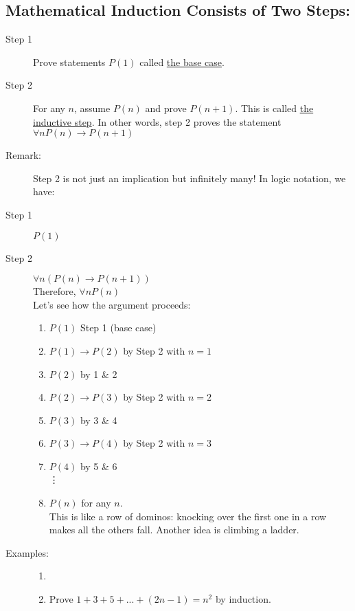 \documentclass[10pt]{article}
\begin{document}
	\subsection{Mathematical Induction Consists of Two Steps:}
	\begin{description}
		\item[Step 1] Prove statements $P(1)$ called \underline{the base case}.
		\item[Step 2] For any $n$, assume $P(n)$ and prove $P(n+1)$. This is called \underline{the inductive step}. In other words, step 2 proves the statement $\forall n P(n) \rightarrow P(n+1)$
		\item[Remark:] Step 2 is not just an implication but infinitely many! In logic notation, we have:
		\item[Step 1] $P(1)$
		\item[Step 2] $\forall n (P(n) \rightarrow P(n+1))$ \\
		Therefore, $\forall n P(n)$ \\
		Let's see how the argument proceeds:
		\begin{enumerate}
			\item $P(1)$ \hspace{10mm} Step 1 (base case)
			\item $P(1) \rightarrow P(2)$ \hspace{10mm} by Step 2 with $n=1$
			\item $P(2)$ \hspace{10mm} by 1 \& 2
			\item $P(2) \rightarrow P(3)$ \hspace{10mm} by Step 2 with $n=2$
			\item $P(3)$ \hspace{10mm} by 3 \& 4
			\item $P(3) \rightarrow P(4)$ \hspace{10mm} by Step 2 with $n=3$
			\item $P(4)$ \hspace{10mm} by 5 \& 6 \\
			\vdots
			\item $P(n)$ for any $n$. \\
			This is like a row of dominos: knocking over the first one in a row makes all the others fall. Another idea is climbing a ladder.
		\end{enumerate}
		\item[Examples:]
		\begin{enumerate}
			\item[]
			\item Prove $1+3+5+...+(2n-1) = n^2$ by induction.

\end{enumerate}
\end{description}
\end{document}
